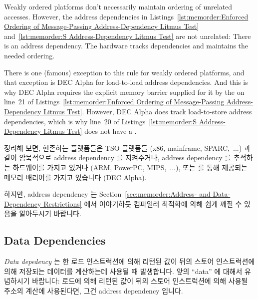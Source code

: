{	Weakly ordered platforms don't necessarily maintain ordering of
	unrelated accesses.
	However, the address dependencies in
	Listings~\ref{lst:memorder:Enforced Ordering of Message-Passing Address-Dependency Litmus Test}
	and~\ref{lst:memorder:S Address-Dependency Litmus Test}
	are not unrelated: There is an address dependency.
	The hardware tracks dependencies and maintains the needed
	ordering.

	There is one (famous) exception to this rule for weakly ordered
	platforms, and that exception is DEC Alpha for load-to-load
	address dependencies.
	And this is why DEC Alpha requires the explicit memory barrier
	supplied for it by the  on line~21 of
	Listings~\ref{lst:memorder:Enforced Ordering of Message-Passing Address-Dependency Litmus Test}.
	However, DEC Alpha does track load-to-store address dependencies,
	which is why line~20 of
	Listings~\ref{lst:memorder:S Address-Dependency Litmus Test}
	does not have a .
	\fi

	정리해 보면, 현존하는 플랫폼들은 TSO 플랫폼들 (x86, mainframe,
	SPARC,~...) 과 같이 암묵적으로 address dependency 를 지켜주거나,
	address dependency 를 추적하는 하드웨어를 가지고 있거나 (ARM, PowerPC,
	MIPS,~...), 또는  를 통해 제공되는 메모리
	배리어를 가지고 있습니다 (DEC Alpha).

} \QuickQuizEnd

하지만, address dependency 는
Section~\ref{sec:memorder:Address- and Data-Dependency Restrictions} 에서
이야기하듯 컴파일러 최적화에 의해 쉽게 깨질 수 있음을 알아두시기 바랍니다.

\subsection{Data Dependencies}
\label{sec:memorder:Data Reordering}

\emph{Data depedency} 는 한 로드 인스트럭션에 의해 리턴된 값이 뒤의 스토어
인스트럭션에 의해 저장되는 데이터를 계산하는데 사용될 때 발생합니다.
앞의 ``data'' 에 대해서 유념하시기 바랍니다: 로드에 의해 리턴된 값이 뒤의
스토어 인스트럭션에 의해 사용될 주소의 계산에 사용된다면, 그건 address
dependency 입니다.
\iffalse


